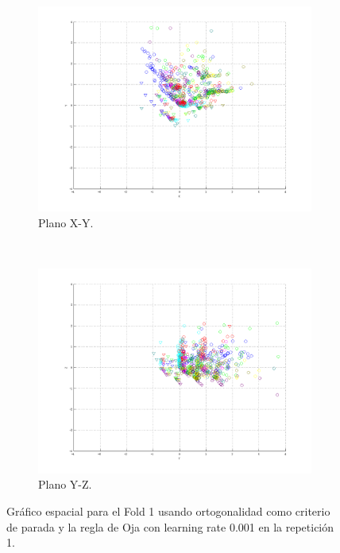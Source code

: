 \documentclass[informe.tex]{subfiles}
\begin{document}
\begin{figure}[H]
        \hspace*{-6.5cm}
        \begin{subfigure}[b]{0.49\textwidth}
                \includegraphics[width=\textwidth]{graficos/fold1_criterioParadao_reglaM_alpha0_rep1_2XY.png}
                \caption{Plano X-Y.}
        \end{subfigure}
        ~
        \begin{subfigure}[b]{0.49\textwidth}
                \includegraphics[width=\textwidth]{graficos/fold1_criterioParadao_reglaM_alpha0_rep1_3YZ.png}
                \caption{Plano Y-Z.}
        \end{subfigure}
	\restoregeometry
        \caption{Gráfico espacial para el Fold 1 usando ortogonalidad como criterio de parada y la regla de Oja con learning rate 0.001 en la repetición 1.}
        \label{fig:fold1_criterioParadao_reglaM_alpha0_rep1}
	\end{figure}
      
\end{document}
